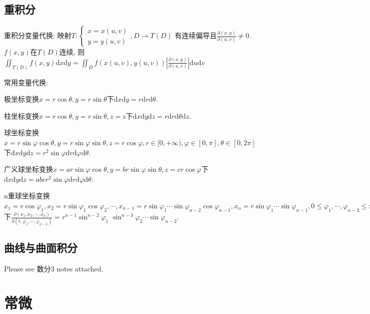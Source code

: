 \documentclass[UTF8]{ctexart}
\begin{document}
\subsection{重积分}

重积分变量代换:
映射$T:
	\left\{\begin{matrix}
		x=x(u,v) \\y=y(u,v)
	\end{matrix}\right.,D\to T(D)$
有连续偏导且$\frac{\partial(x,y)}{\partial(u,v)}\neq 0$.
$f(x,y)$在$T(D)$连续, 则
$\iint_{T(D)}f(x,y)\mathrm{d}x\mathrm{d}y=\iint_{D} f(x(u,v), y(u,v))
	\left|\frac{\partial(x,y)}{\partial(u,v)}\right| \mathrm{d}u\mathrm{d}v$


\noindent 常用变量代换:\par
极坐标变换$x=r\cos\theta,y=r\sin\theta$下$\mathrm{d}x\mathrm{d}y=r\mathrm{d}r\mathrm{d}\theta$.\par
柱坐标变换$x=r\cos\theta,y=r\sin\theta,z=z$下$\mathrm{d}x\mathrm{d}y\mathrm{d}z=r\mathrm{d}r\mathrm{d}\theta\mathrm{d}z$.\par
球坐标变换$x=r\sin\varphi\cos\theta,y=r\sin\varphi\sin\theta,z=r\cos\varphi,
	r\in[0,+\infty),\varphi\in[0,\pi],\theta\in[0,2\pi]$下$\mathrm{d}x\mathrm{d}y\mathrm{d}z
	=r^2\sin\varphi \mathrm{d}r\mathrm{d}\varphi \mathrm{d}\theta$.\par
广义球坐标变换$x=ar\sin\varphi\cos\theta,y=br\sin\varphi\sin\theta,z=cr\cos\varphi$下$\mathrm{d}x\mathrm{d}y\mathrm{d}z
	=abcr^2\sin\varphi \mathrm{d}r\mathrm{d}\varphi \mathrm{d}\theta$.\par
n重球坐标变换$x_{1}=r \cos \varphi_{1}, x_{2}=r \sin \varphi_{1} \cos \varphi_{2}, \cdots,
	x_{n-1}=r \sin \varphi_{1}\cdots \sin \varphi_{n-2} \cos \varphi_{n-1},
	x_{n}=r \sin \varphi_{1}\cdots\sin \varphi_{n-1},
	0\leq \varphi_1,\cdots,\varphi_{n-2}\leq \pi,0\leq \varphi_{n-1}\leq 2\pi$下$
	\frac{\partial\left(x_{1}, x_{2}, \cdots, x_{n}\right)}{\partial\left(r, \varphi_{1}, \cdots, \varphi_{n-1}\right)}=
	r^{n-1} \sin ^{n-2} \varphi_{1}$
$\sin ^{n-3} \varphi_{2} \cdots \sin \varphi_{n-2} $.

\subsection{曲线与曲面积分}
Please see 数分3 notes attached.

\section{常微}
\end{document}

